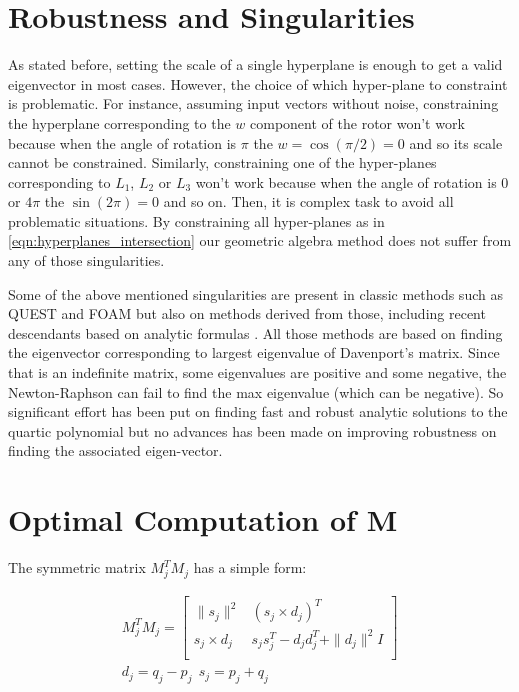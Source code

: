 \documentclass{birkjour}
\numberwithin{equation}{section}
\begin{document}
\section{Robustness and Singularities}
\label{section:robustness}

As stated before, setting the scale of a single hyperplane is enough to get a valid eigenvector in most cases. However, the choice of which hyper-plane to constraint is problematic. For instance,  assuming input vectors without noise, constraining the hyperplane corresponding to the $w$ component of the rotor won't work because when the angle of rotation is $\pi$ the $w = \cos(\pi/2) = 0$ and so its scale cannot be constrained. Similarly, constraining one of the hyper-planes corresponding to $L_1$, $L_2$ or $L_3$ won't work because when the angle of rotation is $0$ or $4 \pi$ the $\sin(2 \pi) = 0$ and so on. Then, it is complex task to avoid all problematic situations. By constraining all hyper-planes as in \ref{eqn:hyperplanes_intersection} our geometric algebra method does not suffer from any of those singularities.

Some of the above mentioned singularities are present in classic methods such as QUEST \cite{Shuster1981} and FOAM \cite{Markley1993} but also on methods derived from those, including recent descendants based on analytic formulas \cite{Yang2013, Wu2016, Wu2017, Wu2018FA3R, Wu2018FS3R}. All those methods are based on finding the eigenvector corresponding to largest eigenvalue of Davenport's matrix. Since that is an indefinite matrix, some eigenvalues are positive and some negative, the Newton-Raphson can fail to find the max eigenvalue (which can be negative). So significant effort has been put on finding fast and robust analytic solutions to the quartic polynomial but no advances has been made on improving robustness on finding the associated eigen-vector.

\section{Optimal Computation of M}

The symmetric matrix $M_j^T M_j$ has a simple form:

\begin{eqnarray*}
	M_j^T M_j = 
	\left[\begin{array}{cc}
		\| s_j \|^2        &         (s_j \times d_j)^T \\
		s_j \times d_j  &    s_j s_j^T - d_j d_j^T + \| d_j \|^2 I \\
	\end{array}\right]\\
	d_j = q_j - p_j \ \ s_j = p_j + q_j
\end{eqnarray*}
\end{document}

